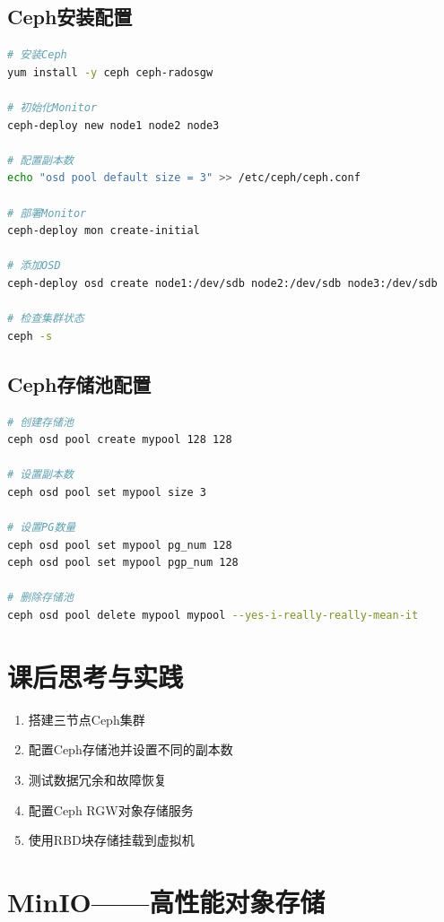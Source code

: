 \documentclass[12pt,UTF8]{ctexbook}
\begin{document}
\subsection{Ceph安装配置}

\begin{lstlisting}[language=bash]
# 安装Ceph
yum install -y ceph ceph-radosgw

# 初始化Monitor
ceph-deploy new node1 node2 node3

# 配置副本数
echo "osd pool default size = 3" >> /etc/ceph/ceph.conf

# 部署Monitor
ceph-deploy mon create-initial

# 添加OSD
ceph-deploy osd create node1:/dev/sdb node2:/dev/sdb node3:/dev/sdb

# 检查集群状态
ceph -s
\end{lstlisting}

\subsection{Ceph存储池配置}

\begin{lstlisting}[language=bash]
# 创建存储池
ceph osd pool create mypool 128 128

# 设置副本数
ceph osd pool set mypool size 3

# 设置PG数量
ceph osd pool set mypool pg_num 128
ceph osd pool set mypool pgp_num 128

# 删除存储池
ceph osd pool delete mypool mypool --yes-i-really-really-mean-it
\end{lstlisting}

\section{课后思考与实践}
\label{sec:distributed-storage-practice}
\begin{enumerate}
    \item 搭建三节点Ceph集群
    \item 配置Ceph存储池并设置不同的副本数
    \item 测试数据冗余和故障恢复
    \item 配置Ceph RGW对象存储服务
    \item 使用RBD块存储挂载到虚拟机
\end{enumerate}

\section{MinIO——高性能对象存储}
\label{sec:minio}
\end{document}
